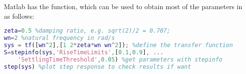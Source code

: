 Matlab has the  function, which can be used to obtain most of the
parameters in  as follows:
\begin{lstlisting}[language=Matlab]
zeta=0.5 %damping ratio, e.g. sqrt(2)/2 = 0.707;
wn=2 %natural frequency in rad/s
sys = tf([wn^2],[1 2*zeta*wn wn^2]); %define the transfer function
S=stepinfo(sys,'RiseTimeLimits',[0.1,0.9], ...
    'SettlingTimeThreshold',0.05) %get parameters with stepinfo
step(sys) %plot step response to check results if want
\end{lstlisting}






